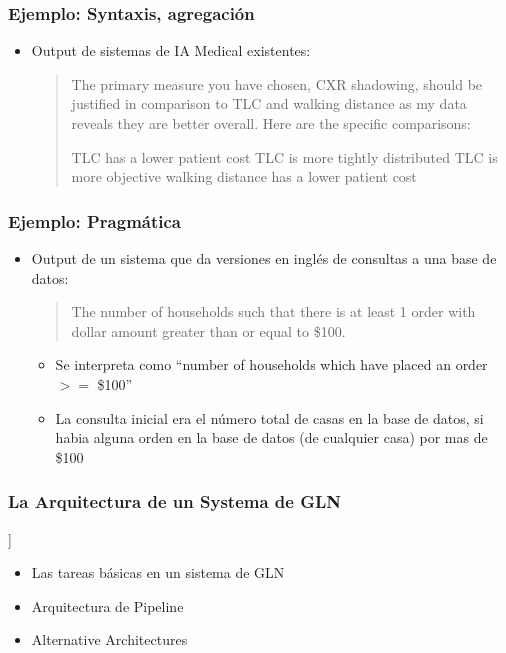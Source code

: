 \documentclass[compress,color=usenames]{beamer}
\begin{document}
\begin{frame}
\frametitle{Ejemplo: Syntaxis, agregaci\'on}

\label{f48}
\begin{itemize}
\item { {Output de sistemas de IA Medical existentes:}}

\begin{quote}
 The primary measure you have chosen, CXR shadowing, should be justified in comparison to TLC and walking distance as my data reveals they are better overall. Here are the specific comparisons:
\medskip

 TLC has a lower patient cost TLC is more tightly distributed TLC is more objective walking distance has a lower patient cost
\end{quote}
\end{itemize}

\end{frame}

\begin{frame}
\frametitle{Ejemplo: Pragm\'atica}

\label{f50}
\begin{itemize}
\item Output de un sistema que da versiones en ingl\'es de consultas a una base de datos:

\begin{quote} 
The number of households such that there is at least 1 order with dollar amount greater 
than or equal to \$100.\pause
\end{quote}

\begin{itemize}

\item Se interpreta como ``number of households which have placed an order 
\mbox{$>=$} \$100'' \pause
\item La consulta inicial era el n\'umero total de casas en la base de datos, si habia alguna 
orden en la base de datos (de cualquier casa) por mas de \$100
\end{itemize}
\end{itemize}

\end{frame}

\begin{frame}
\frametitle{La Arquitectura de un Systema de GLN}

]\begin{itemize}
\item { {Las tareas b\'asicas en un sistema de GLN}}
\item Arquitectura de Pipeline 
\item Alternative Architectures
\end{itemize}

\end{frame}
\end{document}

